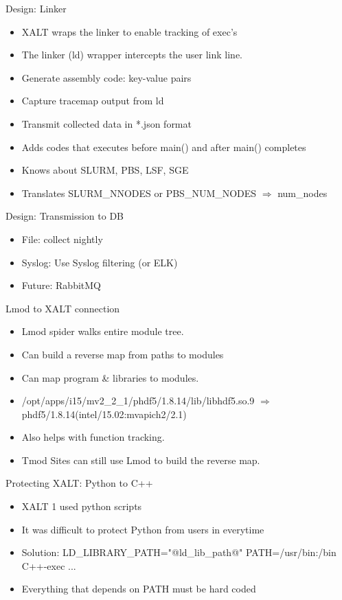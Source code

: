 \documentclass{beamer}
\begin{document}
\begin{frame}{Design: Linker}
  \begin{itemize}
    \item XALT wraps the linker to enable tracking of exec's
    \item The linker (ld) wrapper intercepts the user link line.
    \item Generate assembly code: key-value pairs
    \item Capture tracemap output from ld
    \item Transmit collected data in *.json format
    \item Adds codes that executes before main() and after main()
      completes
    \item Knows about SLURM, PBS, LSF, SGE
    \item Translates SLURM\_NNODES or PBS\_NUM\_NODES $\Rightarrow$ num\_nodes
  \end{itemize}
\end{frame}

\begin{frame}{Design: Transmission to DB}
  \begin{itemize}
    \item File: collect nightly
    \item Syslog: Use Syslog filtering (or ELK)
    \item Future: RabbitMQ
  \end{itemize}
\end{frame}

\begin{frame}{Lmod to XALT connection}
  \begin{itemize}
    \item Lmod spider walks entire module tree.
    \item Can build a reverse map from paths to modules
    \item Can map program \& libraries to modules.
    \item /opt/apps/i15/mv2\_2\_1/phdf5/1.8.14/lib/libhdf5.so.9
      $\Rightarrow$ phdf5/1.8.14(intel/15.02:mvapich2/2.1)
    \item Also helps with function tracking.
    \item Tmod Sites can still use Lmod to build the reverse map.
  \end{itemize}
\end{frame}

\begin{frame}{Protecting XALT: Python to C++}
    \begin{itemize}
      \item XALT 1 used python scripts
      \item It was difficult to protect Python from users in everytime
      \item Solution: LD\_LIBRARY\_PATH="@ld\_lib\_path@"
        PATH=/usr/bin:/bin C++-exec ...
      \item Everything that depends on PATH must be hard coded
    \end{itemize}
\end{frame}
\end{document}
